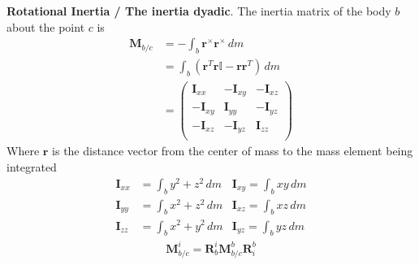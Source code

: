\textbf{Rotational Inertia / The inertia dyadic}. The inertia matrix of the body \(b\) about the point \(c\) is
\begin{align*}
    \bm{M}_{b/c} &= - \int_b \bm{r}^\times\bm{r}^\times\,dm \\
    &= \int_b (\bm{r}^T\bm{r}\mathbb{I} - \bm{r}\bm{r}^T)\,dm\\
    &= \begin{pmatrix}
        \bm{I}_{xx} & -\bm{I}_{xy} & -\bm{I}_{xz} \\
        -\bm{I}_{xy} & \bm{I}_{yy} & -\bm{I}_{yz} \\
        -\bm{I}_{xz} & -\bm{I}_{yz} & \bm{I}_{zz} \\
    \end{pmatrix}
\end{align*}
Where \(\bm{r}\) is the distance vector from the center of mass to the mass element being integrated
\begin{align*}
    \bm{I}_{xx} &= \int_b y^2 + z^2  \,dm & \bm{I}_{xy} = \int_b xy \,dm \\
    \bm{I}_{yy} &= \int_b x^2 + z^2  \,dm & \bm{I}_{xz} = \int_b xz \,dm\\
    \bm{I}_{zz} &= \int_b x^2 + y^2  \,dm & \bm{I}_{yz} = \int_b yz \,dm
\end{align*}
\begin{align*}
    \bm{M}_{b/c}^i = \bm{R}_b^i\bm{M}_{b/c}^b\bm{R}_i^b
\end{align*}

